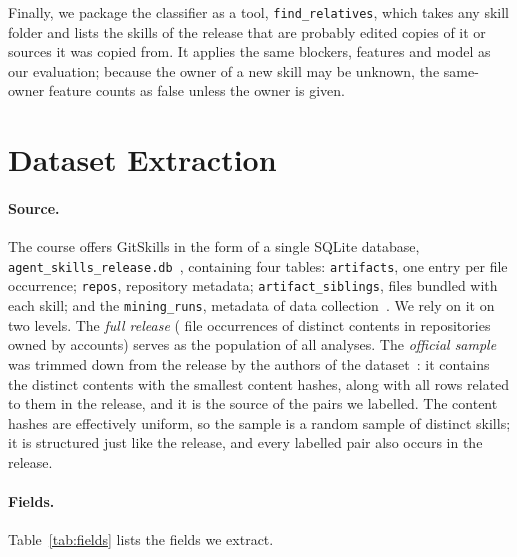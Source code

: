 \documentclass[sigconf,screen]{acmart}
\begin{document}
Finally, we package the classifier as a tool, \texttt{find\_relatives}, which takes any skill folder and lists the skills of the release that are probably edited copies of it or sources it was copied from. It applies the same blockers, features and model as our evaluation; because the owner of a new skill may be unknown, the same-owner feature counts as false unless the owner is given.


\section{Dataset Extraction}
\label{sec:dataset}

\paragraph{Source.} The course offers GitSkills in the form of a single SQLite database, \texttt{agent\_skills\_release.db}~\cite{gitskills_release}, containing four tables: \texttt{artifacts}, one entry per file occurrence; \texttt{repos}, repository metadata; \texttt{artifact\_\allowbreak siblings}, files bundled with each skill; and the \texttt{mining\_runs}, metadata of data collection~\cite{destefanis2027gitskills}. We rely on it on two levels. The \emph{full release} (\ResFullOccTotal{} file occurrences of \ResFullContentsTotal{} distinct contents in \ResFullReposTotal{} repositories owned by \ResFullOwnersTotal{} accounts) serves as the population of all analyses. The \emph{official sample} was trimmed down from the release by the authors of the dataset~\cite{gitskills_sample}: it contains the \ResContentsTotal{} distinct contents with the smallest content hashes, along with all rows related to them in the release, and it is the source of the pairs we labelled. The content hashes are effectively uniform, so the sample is a random sample of distinct skills; it is structured just like the release, and every labelled pair also occurs in the release.

\paragraph{Fields.} Table~\ref{tab:fields} lists the fields we extract.
\end{document}
